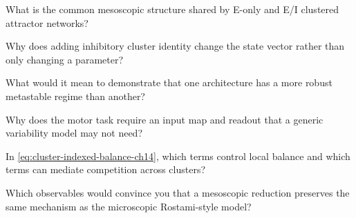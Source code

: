 \begin{conceptquestions}
  \item What is the common mesoscopic structure shared by E-only and E/I clustered attractor networks?

  \item Why does adding inhibitory cluster identity change the state vector rather than only changing a parameter?

  \item What would it mean to demonstrate that one architecture has a more robust metastable regime than another?

  \item Why does the motor task require an input map and readout that a generic variability model may not need?

  \item In \eqref{eq:cluster-indexed-balance-ch14}, which terms control local balance and which terms can mediate competition across clusters?

  \item Which observables would convince you that a mesoscopic reduction preserves the same mechanism as the microscopic Rostami-style model?
\end{conceptquestions}
